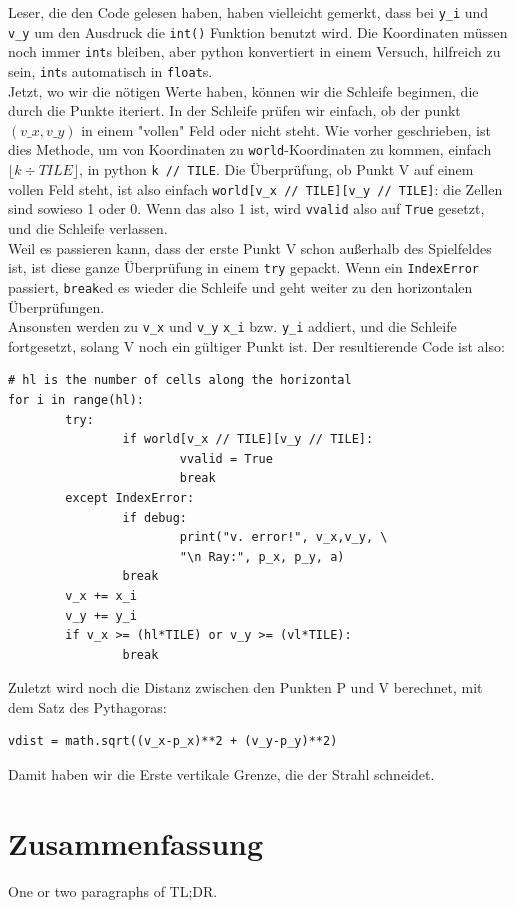 \documentclass[a4paper,12pt]{report}
\begin{document}
Leser, die den Code gelesen haben, haben vielleicht gemerkt, dass bei \texttt{y\_i} und \texttt{v\_y} um den Ausdruck die \texttt{int()} Funktion benutzt wird. Die Koordinaten müssen noch immer \texttt{int}s bleiben, aber python konvertiert in einem Versuch, hilfreich zu sein, \texttt{int}s automatisch in \texttt{float}s. \\

Jetzt, wo wir die nötigen Werte haben, können wir die Schleife beginnen, die durch die Punkte iteriert. In der Schleife prüfen wir einfach, ob der punkt $(v\_x,v\_y)$ in einem "vollen" Feld oder nicht steht. Wie vorher geschrieben, ist dies Methode, um von Koordinaten zu \texttt{world}-Koordinaten zu kommen, einfach $\lfloor k \div TILE \rfloor$, in python \texttt{k // TILE}. Die Überprüfung, ob Punkt V auf einem vollen Feld steht, ist also einfach \texttt{world[v\_x // TILE][v\_y // TILE]}: die Zellen sind sowieso 1 oder 0. Wenn das also 1 ist, wird \texttt{vvalid} also auf \texttt{True} gesetzt, und die Schleife verlassen. \\
Weil es passieren kann, dass der erste Punkt V schon außerhalb des Spielfeldes ist, ist diese ganze Überprüfung in einem \texttt{try} gepackt. Wenn ein \texttt{IndexError} passiert, \texttt{break}ed es wieder die Schleife und geht weiter zu den horizontalen Überprüfungen. \\
Ansonsten werden zu \texttt{v\_x} und \texttt{v\_y} \texttt{x\_i} bzw. \texttt{y\_i} addiert, und die Schleife fortgesetzt, solang V noch ein gültiger Punkt ist. Der resultierende Code ist also:
\begin{Verbatim}[baselinestretch=1.0, xleftmargin=1cm]
# hl is the number of cells along the horizontal
for i in range(hl):
        try:
                if world[v_x // TILE][v_y // TILE]:
                        vvalid = True
                        break
        except IndexError:
                if debug:
                        print("v. error!", v_x,v_y, \
                        "\n Ray:", p_x, p_y, a)
                break
        v_x += x_i
        v_y += y_i
        if v_x >= (hl*TILE) or v_y >= (vl*TILE):
                break
\end{Verbatim}

Zuletzt wird noch die Distanz zwischen den Punkten P und V berechnet, mit dem Satz des Pythagoras:
\begin{Verbatim}[baselinestretch=1.0, xleftmargin=1cm]
vdist = math.sqrt((v_x-p_x)**2 + (v_y-p_y)**2)
\end{Verbatim}

Damit haben wir die Erste vertikale Grenze, die der Strahl schneidet.


\section{Zusammenfassung}
One or two paragraphs of TL;DR.
\end{document}
